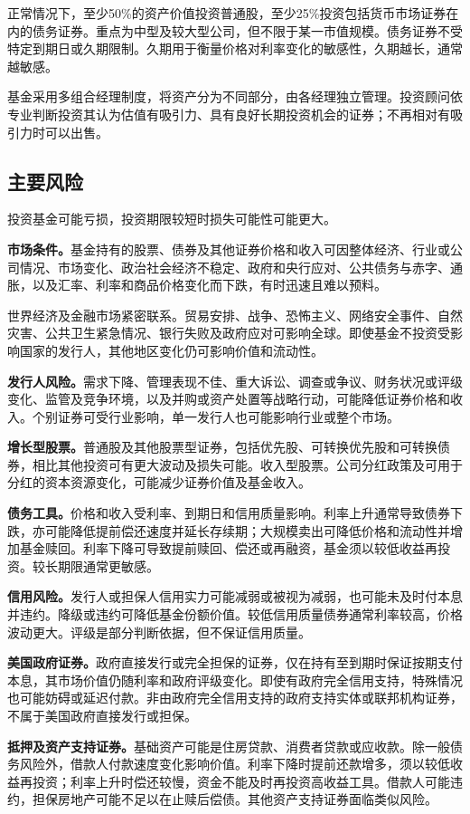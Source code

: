 \documentclass[UTF8,fontset=none,11pt,a4paper]{ctexart}
\begin{document}
正常情况下，至少50\%的资产价值投资普通股，至少25\%投资包括货币市场证券在内的债务证券。重点为中型及较大型公司，但不限于某一市值规模。债务证券不受特定到期日或久期限制。久期用于衡量价格对利率变化的敏感性，久期越长，通常越敏感。


基金采用多组合经理制度，将资产分为不同部分，由各经理独立管理。投资顾问依专业判断投资其认为估值有吸引力、具有良好长期投资机会的证券；不再相对有吸引力时可以出售。


\subsection*{主要风险}
投资基金可能亏损，投资期限较短时损失可能性可能更大。


\textbf{市场条件。}基金持有的股票、债券及其他证券价格和收入可因整体经济、行业或公司情况、市场变化、政治社会经济不稳定、政府和央行应对、公共债务与赤字、通胀，以及汇率、利率和商品价格变化而下跌，有时迅速且难以预料。


世界经济及金融市场紧密联系。贸易安排、战争、恐怖主义、网络安全事件、自然灾害、公共卫生紧急情况、银行失败及政府应对可影响全球。即使基金不投资受影响国家的发行人，其他地区变化仍可影响价值和流动性。


\textbf{发行人风险。}需求下降、管理表现不佳、重大诉讼、调查或争议、财务状况或评级变化、监管及竞争环境，以及并购或资产处置等战略行动，可能降低证券价格和收入。个别证券可受行业影响，单一发行人也可能影响行业或整个市场。


\textbf{增长型股票。}普通股及其他股票型证券，包括优先股、可转换优先股和可转换债券，相比其他投资可有更大波动及损失可能。收入型股票。公司分红政策及可用于分红的资本资源变化，可能减少证券价值及基金收入。


\textbf{债务工具。}价格和收入受利率、到期日和信用质量影响。利率上升通常导致债券下跌，亦可能降低提前偿还速度并延长存续期；大规模卖出可降低价格和流动性并增加基金赎回。利率下降可导致提前赎回、偿还或再融资，基金须以较低收益再投资。较长期限通常更敏感。


\textbf{信用风险。}发行人或担保人信用实力可能减弱或被视为减弱，也可能未及时付本息并违约。降级或违约可降低基金份额价值。较低信用质量债券通常利率较高，价格波动更大。评级是部分判断依据，但不保证信用质量。


\textbf{美国政府证券。}政府直接发行或完全担保的证券，仅在持有至到期时保证按期支付本息，其市场价值仍随利率和政府评级变化。即使有政府完全信用支持，特殊情况也可能妨碍或延迟付款。非由政府完全信用支持的政府支持实体或联邦机构证券，不属于美国政府直接发行或担保。


\textbf{抵押及资产支持证券。}基础资产可能是住房贷款、消费者贷款或应收款。除一般债务风险外，借款人付款速度变化影响价值。利率下降时提前还款增多，须以较低收益再投资；利率上升时偿还较慢，资金不能及时再投资高收益工具。借款人可能违约，担保房地产可能不足以在止赎后偿债。其他资产支持证券面临类似风险。
\end{document}
